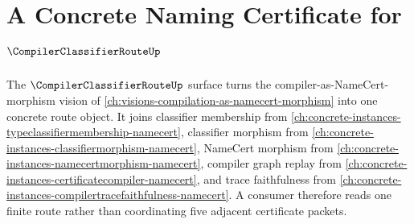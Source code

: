 \chapter{A Concrete Naming Certificate for $\CompilerClassifierRouteUp$}
\label{ch:concrete-instances-compilerclassifierroute-namecert}

The $\CompilerClassifierRouteUp$ surface turns the compiler-as-NameCert-morphism vision of \autoref{ch:visions-compilation-as-namecert-morphism} into one concrete route object. It joins classifier membership from \autoref{ch:concrete-instances-typeclassifiermembership-namecert}, classifier morphism from \autoref{ch:concrete-instances-classifiermorphism-namecert}, NameCert morphism from \autoref{ch:concrete-instances-namecertmorphism-namecert}, compiler graph replay from \autoref{ch:concrete-instances-certificatecompiler-namecert}, and trace faithfulness from \autoref{ch:concrete-instances-compilertracefaithfulness-namecert}. A consumer therefore reads one finite route rather than coordinating five adjacent certificate packets.



